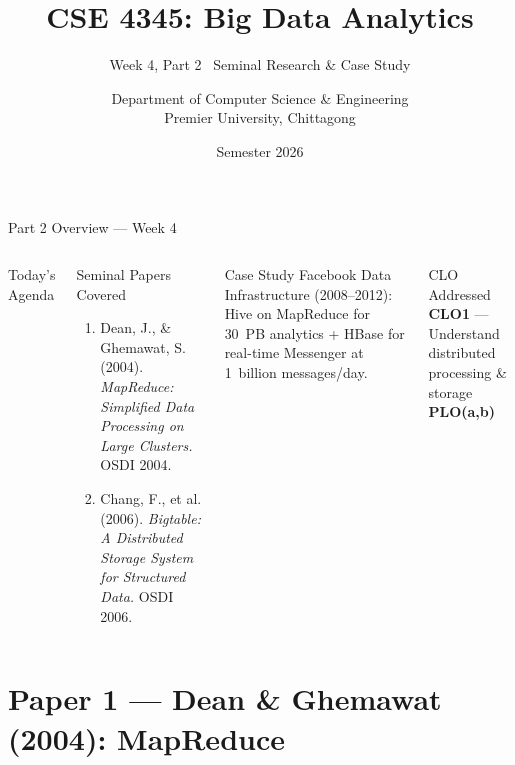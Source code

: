\documentclass[aspectratio=169,10pt]{beamer}
\title[CSE 4345 \textbar{} Week 4, Part 2]{CSE 4345: Big Data Analytics}
\subtitle{Week 4, Part 2 \textemdash\ Seminal Research \& Case Study}
\author[Dept.\ of CSE]{Department of Computer Science \& Engineering\\[4pt]
       \small Premier University, Chittagong}
\institute{}
\date{Semester 2026}
\begin{document}

\begin{frame}
  \titlepage
\end{frame}

\begin{frame}{Part 2 Overview — Week 4}
  \begin{columns}[T]
      \begin{block}{Today's Agenda}
        \tableofcontents
      \end{block}

      \begin{exampleblock}{Seminal Papers Covered}
        \begin{enumerate}
          \item Dean, J., \& Ghemawat, S. (2004).
                \textit{MapReduce: Simplified Data Processing
                on Large Clusters.} OSDI 2004.
          \item Chang, F., et al. (2006).
                \textit{Bigtable: A Distributed Storage System
                for Structured Data.} OSDI 2006.
        \end{enumerate}
      \end{exampleblock}
      \vspace{6pt}
      \begin{alertblock}{Case Study}
        Facebook Data Infrastructure (2008--2012):
        Hive on MapReduce for 30~PB analytics
        + HBase for real-time Messenger at 1~billion messages/day.
      \end{alertblock}
      \vspace{4pt}
      \begin{block}{CLO Addressed}
        \textbf{CLO1} — Understand distributed processing \& storage\\
        \textbf{PLO(a,b)}
      \end{block}
  \end{columns}
\end{frame}

\section{Paper 1 — Dean \& Ghemawat (2004): MapReduce}
\end{document}
